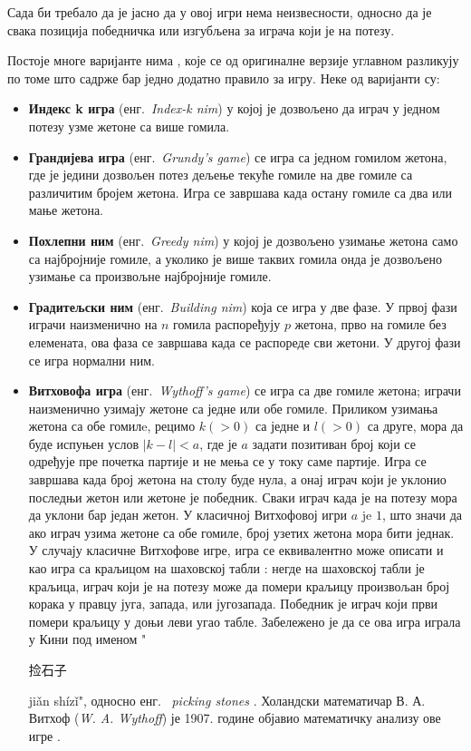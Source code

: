\documentclass[a4paper]{article}
\begin{document}
Сада би требало да је јасно да у овој игри нема неизвесности, односно да је свака позиција победничка или изгубљена за играча који је на потезу.

Постоје многе варијанте нима \cite{ho2011combinatorial, hitotsumatsu1968mathematics}, које се од оригиналне верзије углавном разликују по томе што садрже бар једно додатно правило за игру. Неке од варијанти су:
\begin{itemize}
	\item \textbf{Индекс k игра} (енг.{~\em Index-k nim}) у којој је дозвољено да играч у једном потезу узме жетоне са више гомила. 
	\item \textbf{Грандијева игра} (енг.{~\em Grundy's game}) се игра са једном гомилом жетона, где је једини дозвољен потез дељење текуће гомиле на две гомиле са различитим бројем жетона. Игра се завршава када остану гомиле са два или мање жетона.
	\item \textbf{Похлепни ним} (енг.{~\em Greedy nim}) у којој је дозвољено узимање жетона само са најбројније гомиле, а уколико је више таквих гомила онда је дозвољено узимање са произвољне најбројније гомиле.
	\item \textbf{Градитељски ним} (енг.{~\em Building nim}) која се игра у две фазе. У првој фази играчи наизменично на $ n $ гомила распоређују $ p $ жетона, прво на гомиле без елемената, ова фаза се завршава када се распореде сви жетони. У другој фази се игра нормални ним. 
	\item \textbf{Витховофа игра} (енг.{~\em Wythoff's game}) се игра са две гомиле жетона; играчи наизменично узимају жетоне са једне или обе гомиле. Приликом узимања жетона са обе гомилe, рецимо $ k (> 0) $ са једне и $ l (> 0) $ са друге, мора да буде испуњен услов $ |k - l| < a $, где је $ a $ задати позитиван број који се одређује пре почетка партије и не мења се у току саме партије. Игра се завршава када број жетона на столу буде нула, а онај играч који је уклонио последњи жетон или жетоне је победник. Сваки играч када је на потезу мора да уклони бар један жетон. У класичној Витхофовој игри $ a $ je $ 1 $, што значи да ако играч узима жетоне са обе гомиле, број узетих жетона мора бити једнак. У случају класичне Витхофове игре, игра се еквивалентно може описати и као игра са краљицом на шаховској табли \cite{larsson2010restrictions}: негде на шаховској табли је краљица, играч који је на потезу може да помери краљицу произвољан број корака у правцу југа, запада, или југозапада. Победник је играч који први помери краљицу у доњи леви угао табле. Забележено је да се ова игра играла у Кини  под именом "\begin{CJK}{UTF8}{gbsn}捡石子\end{CJK} jiǎn shízǐ", односно енг. {~\em picking stones} \cite{Yaglom}. Холандски математичар В. А. Витхоф (\textit{W. A. Wythoff}) је 1907. године објавио математичку анализу ове игре \cite{wythoff1907modification}. 
\end{itemize}
\end{document}

